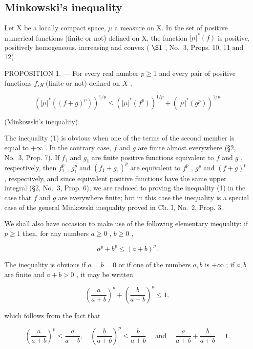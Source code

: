 \subsection{Minkowski's inequality}

Let X be a locally compact space, \(\mu\) a measure on X. In the set of positive numerical functions (finite or not) defined on X, the function \(|\mu|^{*}(f)\) is positive, positively homogeneous, increasing and convex ( \(\S1\) , No.~3, Props. 10, 11 and 12).

PROPOSITION 1. --- For every real number \(p \geqslant 1\) and every pair of positive functions \(f, g\) (finite or not) defined on \(X\) ,

\[
\left(| \mu | ^ {*} ((f + g) ^ {p})\right) ^ {1 / p} \leqslant \left(| \mu | ^ {*} (f ^ {p})\right) ^ {1 / p} + \left(| \mu | ^ {*} (g ^ {p})\right) ^ {1 / p}\tag{1}
\]

(Minkowski's inequality).

The inequality (1) is obvious when one of the terms of the second member is equal to \(+\infty\) . In the contrary case, \(f\) and \(g\) are finite almost everywhere (§2, No.~3, Prop. 7). If \(f_1\) and \(g_1\) are finite positive functions equivalent to \(f\) and \(g\) , respectively, then \(f_1^p\) , \(g_1^p\) and \((f_1 + g_1)^p\) are equivalent to \(f^p\) , \(g^p\) and \((f + g)^p\) , respectively, and since equivalent positive functions have the same upper integral (§2, No.~3, Prop. 6), we are reduced to proving the inequality (1) in the case that \(f\) and \(g\) are everywhere finite; but in this case the inequality is a special case of the general Minkowski inequality proved in Ch. I, No.~2, Prop. 3.

We shall also have occasion to make use of the following elementary inequality: if \(p \geqslant 1\) then, for any numbers \(a \geqslant 0\) , \(b \geqslant 0\) ,

\[
a ^ {p} + b ^ {p} \leqslant (a + b) ^ {p}.\tag{2}
\]

The inequality is obvious if \(a = b = 0\) or if one of the numbers \(a, b\) is \(+\infty\) ; if \(a, b\) are finite and \(a + b > 0\) , it may be written

\[
\left(\frac {a}{a + b}\right) ^ {p} + \left(\frac {b}{a + b}\right) ^ {p} \leqslant 1,
\]

which follows from the fact that

\[
\left(\frac {a}{a + b}\right) ^ {p} \leqslant \frac {a}{a + b}, \quad \left(\frac {b}{a + b}\right) ^ {p} \leqslant \frac {b}{a + b} \quad \text { and } \quad \frac {a}{a + b} + \frac {b}{a + b} = 1.
\]

